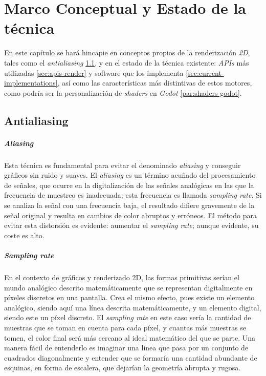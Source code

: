 \chapter{Marco Conceptual y Estado de la técnica} \label{chp:technique-state}

En este capítulo se hará hincapie en conceptos propios de la renderización \textit{2D}, tales como el \textit{antialiasing} \ref{subsec:antialiasing}, y en el estado de la técnica existente: \textit{APIs} más utilizadas \ref{sec:apis-render} y software que los implementa \ref{sec:current-implementations}, así como las características más distintivas de estos motores, como podría ser la personalización de \textit{shaders} en \textit{Godot} \ref{par:shaders-godot}.

\section{Antialiasing} \label{subsec:antialiasing}

\paragraph{Aliasing} Esta técnica es fundamental para evitar el denominado \textit{aliasing} \cite{webVulkanAntialiasing} y conseguir gráficos sin ruido y suaves. El \textit{aliasing} es un término acuñado del procesamiento de señales, que ocurre en la digitalización de las señales analógicas en las que la frecuencia de muestreo es inadecuada; esta frecuencia es llamada \textit{sampling rate}. Si se analiza la señal con una frecuencia baja, el resultado difiere gravemente de la señal original y resulta en cambios de color abruptos y erróneos. El método para evitar esta distorsión es evidente: aumentar el \textit{sampling rate}; aunque evidente, su coste es alto.

\paragraph{Sampling rate} En el contexto de gráficos y renderizado 2D, las formas primitivas serían el mundo analógico descrito matemáticamente que se representan digitalmente en píxeles discretos en una pantalla. Crea el mismo efecto, pues existe un elemento analógico, siendo aquí una línea descrita matemáticamente, y un elemento digital, siendo este un píxel discreto. El \textit{sampling rate} en este caso sería la cantidad de muestras que se toman en cuenta para cada píxel, y cuantas más muestras se tomen, el color final será más cercano al ideal matemático del que se parte. Una manera fácil de entenderlo es imaginar una línea que pasa por un conjunto de cuadrados diagonalmente y entender que se formaría una cantidad abundante de esquinas, en forma de escalera, que dejarían la geometría abrupta y rugosa.

